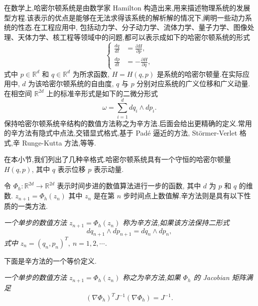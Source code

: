 在数学上,哈密尔顿系统是由数学家 Hamilton 构造出来,用来描述物理系统的发展型方程.该表示的优点是能够在无法求得该系统的解析解的情况下,阐明一些动力系统的性态.在工程应用中, 包括动力学、分子动力学、流体力学、量子力学、图像处理、天体力学、核工程等领域中的问题,都可以表示成如下的哈密尔顿系统的形式 \cite{arieh2009afirst}
\begin{equation}\label{eq:Hamiltonian}
\left\lbrace
\begin{aligned}
\frac{dq}{dt}&=\frac{\partial H}{\partial p},\\
\frac{dp}{dt}&=-\frac{\partial H}{\partial q},
\end{aligned}
\right.
\end{equation}
式中 $p \in \mathbb{R}^d$ 和 $q \in \mathbb{R}^d$ 为所求函数, $H=H(q,p)$ 是系统的哈密尔顿量.在实际应用中, $d$ 为该哈密尔顿系统的自由度, $q$ 与 $p$ 分别对应系统的广义位移和广义动量.在相空间 $\mathbb{R}^{2d}$ 上的标准辛形式是如下的二微分形式
\begin{equation*}
\omega = \sum_{i=1}^d d q_i \wedge d p_i.
\end{equation*}
保持哈密尔顿系统辛结构的数值方法称之为辛方法.后面会给出更精确的定义.常用的辛方法有隐式中点法,交错显式格式,基于 Pad\'{e} 逼近的方法, St\"{o}rmer-Verlet 格式,辛 Runge-Kutta 方法,等等.

在本小节,我们列出了几种辛格式.哈密尔顿系统具有一个守恒的哈密尔顿量 $H(q,p)$, 其中 $q$ 表示位移 $p$ 表示动量.


令 $\Phi_h : \mathbb{R}^{2d} \to \mathbb{R}^{2d}$ 表示时间步进的数值算法进行一步的函数, 其中 $d$ 为 $p$ 和 $q$ 的维数. $z_{n+1}=\Phi_h(z_n)$ 其中 $z_n$ 是在第 $n$ 步时间点上数值解.辛方法则是具有以下性质的一类方法.

\begin{definition}
\emph{一个单步的数值方法 $z_{n+1}=\Phi_h(z_n)$ 称为辛方法,如果该方法保持二形式
\begin{equation*}
dq_{n+1}\wedge dp_{n+1}=dq_n\wedge dp_n,
\end{equation*}
式中 $z_n=(q_n,p_n)^T,~n=1,2,\cdots$.}
\end{definition}

下面是辛方法的一个等价定义.

\begin{definition}\label{def:symplectic}
\emph{一个单步的数值方法 $z_{n+1}=\Phi_h(z_n)$ 称之为辛方法,如果 $\Phi_h$ 的 Jacobian 矩阵满足
\begin{equation*}
(\nabla\Phi_h)^TJ^{-1}(\nabla\Phi_h)=J^{-1}.
\end{equation*}}
\end{definition}

